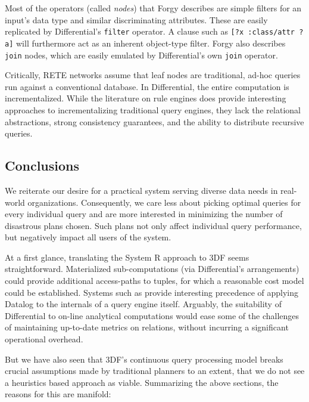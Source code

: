 \documentclass[../index.tex]{subfiles}
\begin{document}
Most of the operators (called \emph{nodes}) that Forgy describes are
simple filters for an input's data type and similar discriminating
attributes. These are easily replicated by Differential's
\texttt{filter} operator. A clause such as \texttt{[?x :class/attr
    ?a]} will furthermore act as an inherent object-type filter.
Forgy also describes \texttt{join} nodes, which are easily emulated by
Differential's own \texttt{join} operator.

Critically, RETE networks assume that leaf nodes are traditional,
ad-hoc queries run against a conventional database. In Differential,
the entire computation is incrementalized. While the literature on
rule engines does provide interesting approaches to incrementalizing
traditional query engines, they lack the relational abstractions,
strong consistency guarantees, and the ability to distribute recursive
queries.

\subsection{Conclusions}

We reiterate our desire for a practical system serving diverse data
needs in real-world organizations. Consequently, we care less about
picking optimal queries for every individual query and are more
interested in minimizing the number of disastrous plans chosen. Such
plans not only affect individual query performance, but negatively
impact all users of the system.

At a first glance, translating the System R approach to 3DF seems
straightforward. Materialized sub-computations (via Differential's
arrangements) could provide additional access-paths to tuples, for
which a reasonable cost model could be established. Systems such as
\cite{condie2008evita} provide interesting precedence of applying
Datalog to the internals of a query engine itself. Arguably, the
suitability of Differential to on-line analytical computations would
ease some of the challenges of maintaining up-to-date metrics on
relations, without incurring a significant operational overhead.

But we have also seen that 3DF's continuous query processing model
breaks crucial assumptions made by traditional planners to an extent,
that we do not see a heuristics based approach as viable. Summarizing
the above sections, the reasons for this are manifold:
\end{document}
